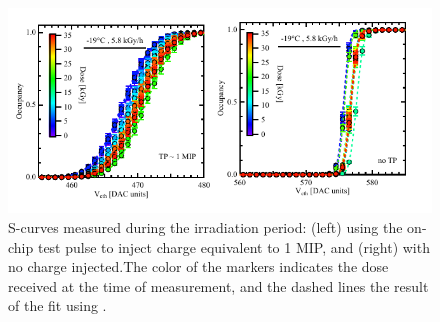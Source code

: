 
\begin{figure}[!htbp]
\centering
\includegraphics[width=1.1\linewidth]{Figures/Scurves_Chip4.pdf}
\vspace*{-10mm}
\caption{S-curves measured during the irradiation period: (left) using the on-chip test pulse to inject charge equivalent to 1 MIP, and (right) with no charge injected.The color of the markers indicates the dose received at the time of measurement, and the dashed lines the result of the fit using .}
\label{fig:Scurves}
\end{figure}

